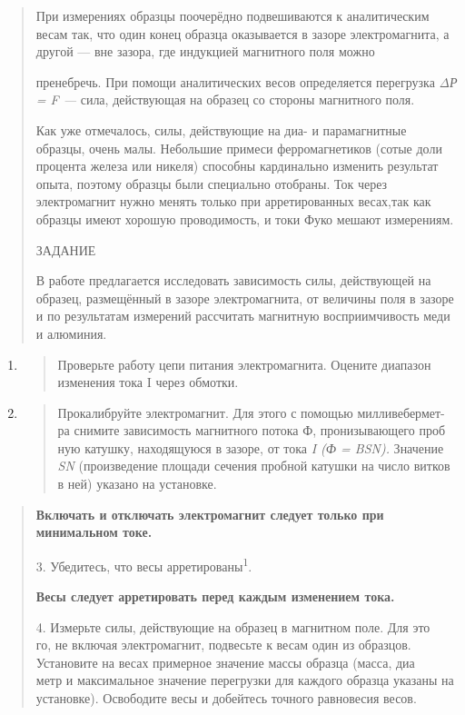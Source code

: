 \documentclass[]{article}
\begin{document}
\begin{quote}
При измерениях образцы поочерёдно подвешиваются к аналитиче­ским весам
так, что один конец образца оказывается в зазоре электро­магнита, а
другой --- вне зазора, где индукцией магнитного поля можно

пренебречь. При помощи аналитических весов определяется перегруз­ка
\emph{ΔР = F ---} сила, действующая на образец со стороны магнитного
поля.

Как уже отмечалось, силы, действующие на диа- и парамагнитные образцы,
очень малы. Небольшие примеси ферромагнетиков (сотые до­ли процента
железа или никеля) способны кардинально изменить ре­зультат опыта,
поэтому образцы были специально отобраны. Ток через электромагнит нужно
менять только при арретированных весах,так как образцы имеют хорошую
проводимость, и токи Фуко мешают измерениям.

ЗАДАНИЕ

В работе предлагается исследовать зависимость силы, действующей на
образец, размещённый в зазоре электромагнита, от величины поля в зазоре
и по результатам измерений рассчитать магнитную восприим­чивость меди и
алюминия.
\end{quote}

\begin{enumerate}
\def\labelenumi{\arabic{enumi}.}
\item
  \begin{quote}
  Проверьте работу цепи питания электромагнита. Оцените диапазон\\
  изменения тока I через обмотки.
  \end{quote}
\item
  \begin{quote}
  Прокалибруйте электромагнит. Для этого с помощью милливебермет-\\
  ра снимите зависимость магнитного потока Ф, пронизывающего проб­\\
  ную катушку, находящуюся в зазоре, от тока \emph{I (Ф = BSN).}
  Значение\\
  \emph{SN} (произведение площади сечения пробной катушки на число
  витков\\
  в ней) указано на установке.
  \end{quote}
\end{enumerate}

\begin{quote}
\textbf{Включать и отключать электромагнит следует только при
минимальном токе.}

3. Убедитесь, что весы арретированы\textsuperscript{1}.

\textbf{Весы следует арретировать перед каждым изменением тока.}

4. Измерьте силы, действующие на образец в магнитном поле. Для это­\\
го, не включая электромагнит, подвесьте к весам один из образцов.\\
Установите на весах примерное значение массы образца (масса, диа­\\
метр и максимальное значение перегрузки для каждого образца ука­заны на
установке). Освободите весы и добейтесь точного равновесия весов.
\end{quote}
\end{document}
